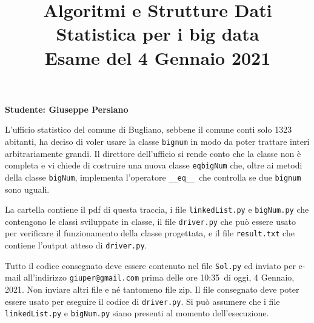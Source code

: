\documentclass{amsart}
\begin{document}
\title{Algoritmi e Strutture Dati\\
Statistica per i big data\\
Esame del 4 Gennaio 2021
}


\newcommand{\NomeStudente}{Giuseppe Persiano}
\newcommand{\nomeClasse}{{\tt{Sol}}}
\newcommand{\nomeMetodo}{{\tt \_\_eq\_\_}}
\newcommand{\oraconsegna}{10:35}
\newcommand{\dataoggi}{4 Gennaio, 2021}


\maketitle

\hfill{{\bf Studente: \NomeStudente}}

\smallskip
L'ufficio statistico del comune di Bugliano, sebbene il
comune conti solo 1323 abitanti,
ha deciso di voler usare la classe {\tt bignum} in modo da 
poter trattare interi arbitrariamente grandi.
Il direttore dell'ufficio si rende conto che la classe non \`e completa
e vi chiede di costruire una nuova classe
{\tt eqbigNum} che, oltre ai metodi della classe 
{\tt bigNum}, implementa l'operatore \nomeMetodo\
che controlla se due {\tt bignum} sono uguali.

\medskip{}
La cartella contiene il pdf di questa traccia, i file
{\tt linkedList.py} e {\tt bigNum.py} che contengono le classi sviluppate
in classe, il file {\tt driver.py} che pu\`o essere usato
per verificare il funzionamento della classe progettata,
e il file  {\tt result.txt} che contiene l'output atteso di {\tt driver.py}.

\medskip{}
Tutto il codice consegnato deve essere contenuto nel file
{\tt Sol.py} ed inviato per e-mail all'indirizzo
{\tt giuper@gmail.com} prima delle ore \oraconsegna\ di oggi, 
\dataoggi. Non inviare altri file e n\'e tantomeno file zip.
Il file consegnato deve poter essere usato per eseguire
il codice di {\tt driver.py}. 
Si pu\`o assumere che i file {\tt linkedList.py} e {\tt bigNum.py} 
siano presenti al momento dell'esecuzione.
\end{document}
